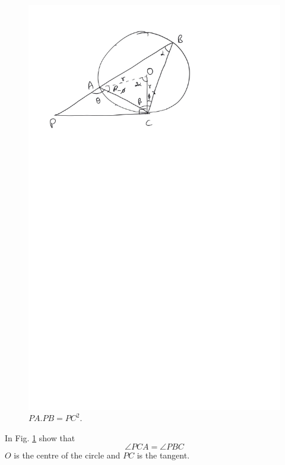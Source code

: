 	\begin{figure}[!h]
		\begin{center}
			
			\includegraphics[width=\columnwidth]{./figs/ch4_tangent_prod}
			\vspace*{-10cm}
		\end{center}
		\caption{$PA.PB = PC^2$.}
		\label{ch4_tangent_prod}	
	\end{figure}
\begin{problem}
In Fig. \ref{ch4_tangent_prod} show that 
%
\begin{equation}
\angle PCA = \angle PBC
\end{equation}
%
$O$ is the centre of the circle and $PC$ is the tangent.
\end{problem}
